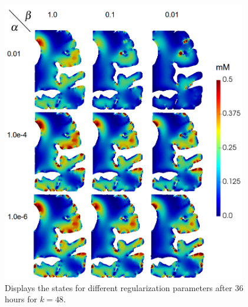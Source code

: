 \documentclass[12pt,a4paper]{article}
\begin{document}
\begin{figure}
\centering
\includegraphics[width=0.95\textwidth]{Statecomparison36h-pinta.png} 
\caption{ Displays the states for different regularization parameters after 36 hours for $k=48$.}
\label{statecomparison}
\end{figure}

 
\end{document}

